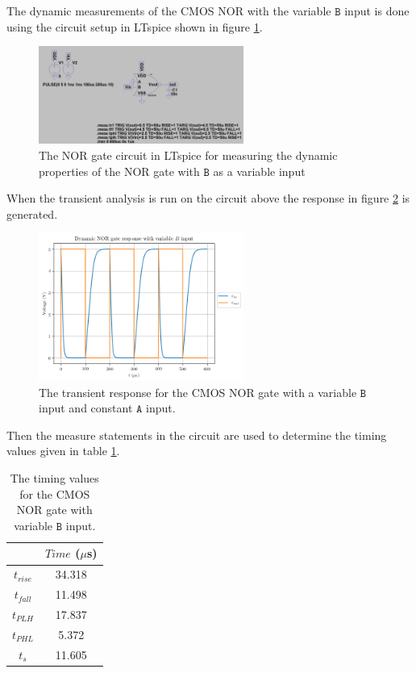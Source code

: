 \documentclass[titlepage, 12pt]{article}
\newcommand\sA{\ensuremath{\mathtt{A}}}
\newcommand\sB{\ensuremath{\mathtt{B}}}
\begin{document}
    The dynamic measurements of the CMOS NOR with the variable $\sB$ input
    is done using the circuit setup in LTspice shown in figure
    \ref{fig:part_22_NOR_B_circuit}.
    \begin{figure}[H]
        \centering
        \includegraphics[width=0.6\textwidth]
        {figures/part_22_NOR_B_circuit.png}
        \caption{The NOR gate circuit in LTspice for measuring the
            dynamic properties of the NOR gate with $\sB$ as a variable
        input}
        \label{fig:part_22_NOR_B_circuit}
    \end{figure}
    When the transient analysis is run on the circuit above the response
    in figure \ref{fig:part_22_NOR_B} is generated.
    \begin{figure}[H]
        \centering
        \includegraphics[width=0.6\textwidth]{figures/part_22_NOR_B.png}
        \caption{The transient response for the CMOS NOR gate with a
        variable $\sB$ input and constant $\sA$ input.}
        \label{fig:part_22_NOR_B}
    \end{figure}
    Then the measure statements in the circuit are used to determine the
    timing values given in table \ref{tab:NOR_B_time}.
    \begin{table}[H]
        \centering
        \caption{The timing values for the CMOS NOR gate with variable
        $\sB$ input.}
        \label{tab:NOR_B_time}
        \begin{tabular}{c|c}
            & $Time$ ($\mu$s)\\
            \hline
            $t_{rise}$ & 34.318\\
            $t_{fall}$ & 11.498\\
            $t_{PLH}$ & 17.837\\
            $t_{PHL}$ & 5.372\\
            $t_s$ & 11.605\\
        \end{tabular}
    \end{table}
\end{document}
